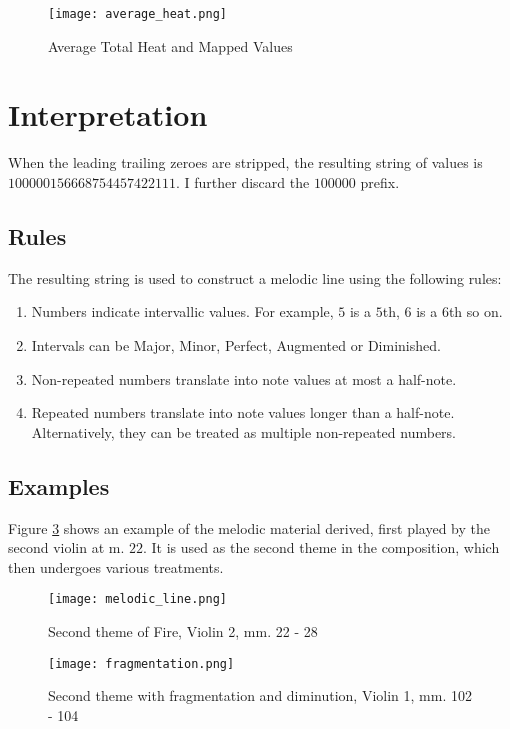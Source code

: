 \documentclass[12pt]{article}
\begin{document}
\begin{figure}[h!]
\centerline{\texttt{[image: average\_heat.png]}}
\caption{Average Total Heat and Mapped Values}
\label{mapped_data}
\end{figure}

\section{Interpretation}
When the leading trailing zeroes are stripped, the resulting string of values is \\
$100000156668754457422111$. I further discard the $100000$ prefix. 
\subsection{Rules}
The resulting string is used to construct a melodic line using the following rules:
\begin{enumerate}
\item Numbers indicate intervallic values. For example, $5$ is a $5$th, $6$ is a $6$th so on.
\item Intervals can be Major, Minor, Perfect, Augmented or Diminished.
\item Non-repeated numbers translate into note values at most a half-note.
\item Repeated numbers translate into note values longer than a half-note. Alternatively, they can be treated as multiple non-repeated numbers.
\end{enumerate}
\subsection{Examples}
Figure \ref{melodic_line} shows an example of the melodic material derived, first played by the second violin at m. $22$. It is used as the second theme in the composition, which then undergoes various treatments.

\begin{figure}[h!]
\centerline{\texttt{[image: melodic\_line.png]}}
\caption{Second theme of Fire, Violin 2, mm. 22 - 28}
\label{melodic_line}
\end{figure}

\begin{figure}[h!]
\centerline{\texttt{[image: fragmentation.png]}}
\caption{Second theme with fragmentation and diminution, Violin 1, mm. 102 - 104}
\label{melodic_line}
\end{figure}
\end{document}
